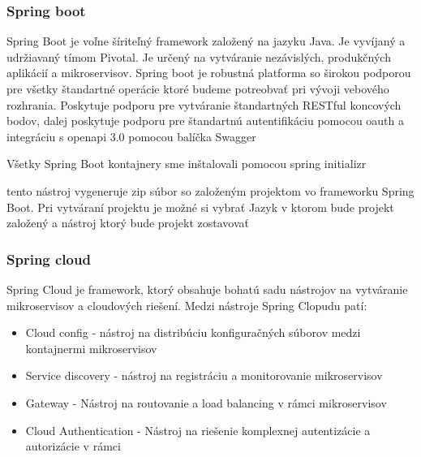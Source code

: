  
 
\subsubsection{Spring boot} 

Spring Boot je voľne šíriteľný framework založený na jazyku Java. Je vyvíjaný a udržiavaný tímom Pivotal. Je určený na vytváranie nezávislých, produkčných aplikácií a mikroservisov. Spring boot je robustná platforma so širokou podporou pre všetky štandartné operácie ktoré budeme potreobvať pri vývoji vebového rozhrania. Poskytuje podporu pre vytváranie štandartných RESTful koncových bodov, dalej poskytuje podporu pre štandartnú autentifikáciu pomocou \acrshort{oauth} a integráciu s  openapi 3.0 pomocou balíčka Swagger






 Všetky Spring Boot kontajnery sme inštalovali pomocou spring initializr \cite{initializr}

tento nástroj vygeneruje zip súbor so založeným projektom vo frameworku Spring Boot. Pri vytváraní projektu je možné si vybrať Jazyk v ktorom bude projekt založený a nástroj ktorý bude projekt zostavovať %


  

\subsubsection{Spring cloud} 

 Spring Cloud je framework, ktorý obsahuje bohatú sadu nástrojov na vytváranie mikroservisov a cloudových riešení. Medzi nástroje Spring Clopudu patí:  

\begin{itemize} 

\item Cloud config - nástroj na distribúciu konfiguračných súborov medzi kontajnermi mikroservisov

\item Service discovery - nástroj na registráciu a monitorovanie mikroservisov 

\item Gateway - Nástroj na routovanie a load balancing v rámci mikroservisov 

\item Cloud Authentication - Nástroj na riešenie komplexnej autentizácie a autorizácie v rámci 

\end{itemize} 


